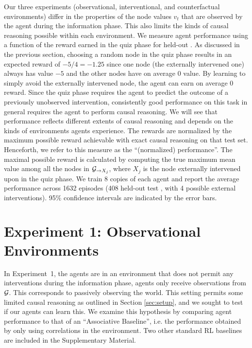 Our three experiments (observational, interventional, and counterfactual environments) differ in the properties of the node values $v_t$ that are observed by the agent during the information phase. This also limits the kinds of causal reasoning possible within each environment. We measure agent performance using a function of the reward earned in the quiz phase for held-out \CBNs. 
As discussed in the previous section, choosing a random node in the quiz phase results in an expected reward of $-5 / 4 = -1.25$ since one node (the externally intervened one) always has value $-5$ and the other nodes have on average $0$ value. By learning to simply avoid the externally intervened node, the agent can earn on average $0$ reward. Since the quiz phase requires the agent to predict the outcome of a previously unobserved intervention, consistently good performance on this task in general requires the agent to perform causal reasoning. We will see that performance reflects different extents of causal reasoning and depends on the kinds of environments agents experience. The rewards are normalized by the maximum possible reward achievable with exact causal reasoning on that test set. Henceforth, we refer to this measure as the ``(normalized) performance''. The maximal possible reward is calculated by computing the true maximum mean value among all the nodes in ${\cal G}_{\rightarrow X_j}$, where $X_j$ is the node externally intervened upon in the quiz phase. %
We train 8 copies of each agent and report the average performance across 1632 episodes (408 held-out test \CBNs, with 4 possible external interventions). 95$\%$ confidence intervals are indicated by the error bars. 

\section{Experiment 1: Observational Environments}
\label{sec:expt1}

In Experiment~1, the agents are in an environment that does not permit any interventions during the information phase, agents only receive observations from ${\cal G}$.
This corresponds to passively observing the world. This setting permits some limited causal reasoning as outlined in Section \ref{sec:setup}, and we sought to test if our agents can learn this. We examine this hypothesis by comparing agent performance to that of an ``Associative Baseline'', i.e. the performance obtained by only using correlations in the environment. Two other standard RL baselines are included in the Supplementary Material.

